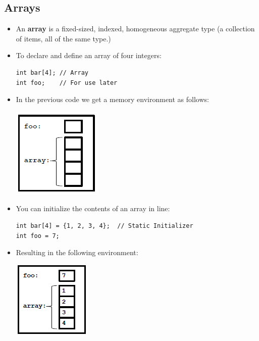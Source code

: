 \subsection{Arrays}
\begin{itemize}
	\item An \textbf{array} is a fixed-sized, indexed, homogeneous aggregate type (a collection of items, all of the same type.)
	\item To declare and define an array of four integers:
\begin{lstlisting}[style=C++]
int bar[4];	// Array
int foo; 	// For use later
\end{lstlisting}
	
	\item In the previous code we get a memory environment as follows:
	\begin{center}
		\includegraphics[scale=.9]{sections/lec6/m1.png}
	\end{center}

	\item You can initialize the contents of an array in line:
\begin{lstlisting}[style=C++]
int bar[4] = {1, 2, 3, 4};	// Static Initializer
int foo = 7; 	
\end{lstlisting}
	\item Resulting in the following environment:
	\begin{center}
		\includegraphics[scale=0.9]{sections/lec6/m2.png}
	\end{center}
\end{itemize}

